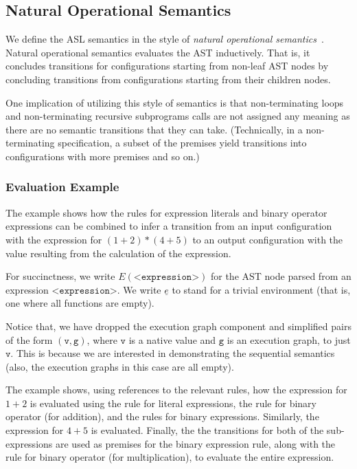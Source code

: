 \documentclass{book}
\newcommand\emptyenv[0]{\underline{e}}
\newcommand\vg[0]{\texttt{g}}
\newcommand\vv[0]{\texttt{v}}
\begin{document}
\subsection{Natural Operational Semantics}
We define the ASL semantics in the style of \emph{natural operational semantics}~\cite{SemanticsWithApplicationsBook}.
Natural operational semantics evaluates the AST inductively.
That is, it concludes transitions for configurations starting from
non-leaf AST nodes by concluding transitions from configurations starting from their children nodes.

One implication of utilizing this style of semantics is that non-terminating loops and non-terminating
recursive subprograms calls are not assigned any meaning as there are no semantic transitions that they can take.
(Technically, in a non-terminating specification, a subset of the premises yield transitions into configurations
with more premises and so on.)

\subsubsection{Evaluation Example}

The example shows how the rules for expression literals and binary operator expressions can be combined
to infer a transition from an input configuration with the expression for $(1+2)*(4+5)$ to an output configuration
with the value resulting from the calculation of the expression.

For succinctness, we write $E(\texttt{<expression>})$
for the AST node parsed from an expression $\texttt{<expression>}$.
%
We write $\emptyenv$ to stand for a trivial environment (that is, one where all functions are empty).

Notice that, we have dropped the execution graph component and simplified pairs of the form $(\vv,\vg)$,
where $\vv$ is a native value and $\vg$ is an execution graph, to just $\vv$.
This is because we are interested in demonstrating the sequential semantics (also, the execution graphs
in this case are all empty).

The example shows, using references to the relevant rules, how the expression for $1+2$ is evaluated
using the rule for literal expressions, the rule for binary operator (for addition), and the rules for binary expressions.
Similarly, the expression for $4+5$ is evaluated.
Finally, the the transitions for both of the sub-expressions are used as premises for the binary expression
rule, along with the rule for binary operator (for multiplication), to evaluate the entire expression.
\end{document}
